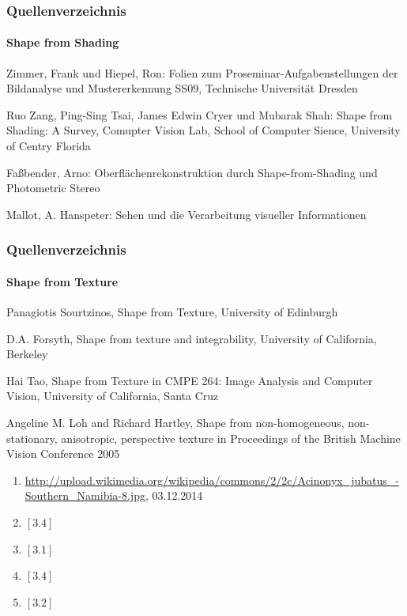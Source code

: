 \documentclass{beamer}
\begin{document}
\begin{frame}
	\frametitle{Quellenverzeichnis}
	\framesubtitle{Shape from Shading}
	
	\begin{tiny}
		\begin{enumerate}[label={[2.\arabic*]}]
			\item Zimmer, Frank und Hiepel, Ron: Folien zum Proseminar-Aufgabenstellungen der Bildanalyse und Mustererkennung SS09, Technische Universität Dresden
			\item Ruo Zang, Ping-Sing Tsai, James Edwin Cryer und Mubarak Shah: Shape from Shading: A Survey, Comupter Vision Lab, School of Computer Sience, University of Centry Florida
			\item Faßbender, Arno: Oberflächenrekonstruktion durch Shape-from-Shading und Photometric Stereo
			\item Mallot, A. Hanspeter: Sehen und die Verarbeitung visueller Informationen
		\end{enumerate}
	\end{tiny}
\end{frame}


\begin{frame}
	\frametitle{Quellenverzeichnis}
	\framesubtitle{Shape from Texture}
	
	\begin{tiny}
	\begin{enumerate}[label={[3.\arabic*]}]
	\item Panagiotis Sourtzinos, Shape from Texture, University of Edinburgh
	\item D.A. Forsyth, Shape from texture and integrability, University of California, Berkeley
	\item Hai Tao, Shape from Texture in CMPE 264: Image Analysis and Computer Vision, University of California, Santa Cruz
	\item Angeline M. Loh and Richard Hartley, Shape from non-homogeneous, non-stationary, anisotropic, perspective texture in Proceedings of the British Machine Vision Conference 2005
	\end{enumerate}
	\vspace{1em}
	\begin{enumerate}[label={Fig. 3.\arabic*}]
	\item \href{http://upload.wikimedia.org/wikipedia/commons/2/2c/Acinonyx_jubatus_-Southern_Namibia-8.jpg}{http://upload.wikimedia.org/wikipedia/commons/2/2c/Acinonyx\_jubatus\_-Southern\_Namibia-8.jpg}, 03.12.2014
	\item $\left[3.4\right]$
	\item $\left[3.1\right]$
	\item $\left[3.4\right]$
	\item $\left[3.2\right]$
	\end{enumerate}
	\end{tiny}
\end{frame}
\end{document}
